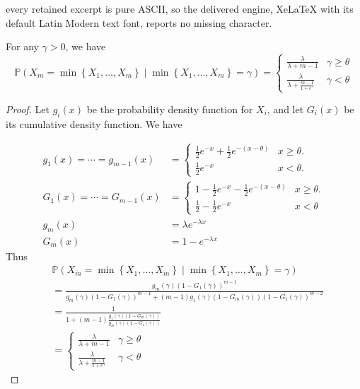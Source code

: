 \documentclass[10pt,a4paper]{amsart}
\def\Pr{\mathbb{P}}
\def\g{\gamma}
\def\th{\theta} \def\TH{\Theta} \def\Th{\Theta}  \def\l{\lambda}
\newcommand{\beq}[2]{\begin{equation}\label{#1}#2\end{equation}}
\newcommand{\set}[1]{\left\{#1\right\}}
\begin{document}
every retained excerpt is pure ASCII, so the delivered engine, XeLaTeX with its default Latin Modern text font, reports no missing character.
\begin{claim}
 For any $\g>0$, we have
 \beq{eq:conditional}
 {
 \Pr(X_m=\min\set{X_1,\ldots,X_m}\mid \min\set{X_1,\ldots,X_m}=\g)= \begin{cases}
\frac{\lambda}{\lambda + m-1} & \g \ge \th\\
    \frac{\lambda}{\lambda + \frac{m-1}{1+e^\g}}& \g < \th
\end{cases}
 }
\end{claim}

\begin{proof}
Let $g_i(x)$ be the probability density function for $X_i$, and let $G_i(x)$ be its cumulative density function. We have

\begin{align*}
g_1(x) = \cdots = g_{m-1}(x)&=\begin{cases}\frac12e^{-x}+\frac12e^{-(x-\th)}&x\geq \th.\\ \frac12e^{-x}&x<\th.\end{cases}\\
G_1(x) = \cdots = G_{m-1}(x)&=\begin{cases}1-\frac12e^{-x}-\frac12e^{-(x-\th)}&x\geq \th.\\ \frac12 - \frac12e^{-x}&x<\th\end{cases}\\
g_m(x) &= \lambda e^{-\lambda x}\\
G_m(x) &= 1- e^{-\lambda x}
\end{align*}
 Thus 
 \begin{align*}
&\Pr(X_m=\min\set{X_1,\ldots,X_m}\mid \min\set{X_1,\ldots,X_m}=\g)\\
&=\frac{g_m(\g)(1-G_1(\g))^{m-1}}{g_m(\g)(1-G_1(\g))^{m-1}+(m-1)g_1(\g) (1-G_m(\g))(1-G_1(\g))^{m-2}}\\
&=\frac{1}{1+(m-1)\frac{g_1(\g)(1-G_m(\g))}{g_m(\g)(1-G_1(\g))}}\\
& =  \begin{cases}
\frac{\lambda}{\lambda + m-1} & \g \ge \th\\
    \frac{\lambda}{\lambda + \frac{m-1}{1+e^\g}}& \g < \th
\end{cases}
\end{align*}



\end{proof}
\end{document}
